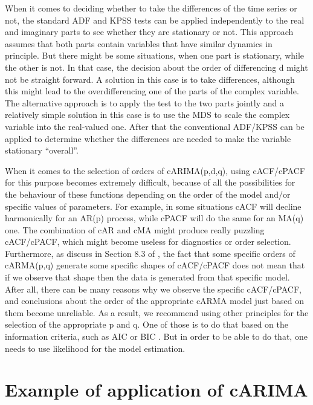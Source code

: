 \documentclass[
]{book}
\begin{document}
When it comes to deciding whether to take the differences of the time series or not, the standard ADF \citep{Dickey1979} and KPSS \citep{Kwiatkowski1992} tests can be applied independently to the real and imaginary parts to see whether they are stationary or not. This approach assumes that both parts contain variables that have similar dynamics in principle. But there might be some situations, when one part is stationary, while the other is not. In that case, the decision about the order of differencing d might not be straight forward. A solution in this case is to take differences, although this might lead to the overdifferencing one of the parts of the complex variable. The alternative approach is to apply the test to the two parts jointly and a relatively simple solution in this case is to use the MDS to scale the complex variable into the real-valued one. After that the conventional ADF/KPSS can be applied to determine whether the differences are needed to make the variable stationary ``overall''.

When it comes to the selection of orders of cARIMA(p,d,q), using cACF/cPACF for this purpose becomes extremely difficult, because of all the possibilities for the behaviour of these functions depending on the order of the model and/or specific values of parameters. For example, in some situations cACF will decline harmonically for an AR(p) process, while cPACF will do the same for an MA(q) one. The combination of cAR and cMA might produce really puzzling cACF/cPACF, which might become useless for diagnostics or order selection. Furthermore, as discuss in Section 8.3 of \citet{SvetunkovAdam}, the fact that some specific orders of cARMA(p,q) generate some specific shapes of cACF/cPACF does not mean that if we observe that shape then the data is generated from that specific model. After all, there can be many reasons why we observe the specific cACF/cPACF, and conclusions about the order of the appropriate cARMA model just based on them become unreliable. As a result, we recommend using other principles for the selection of the appropriate p and q. One of those is to do that based on the information criteria, such as AIC \citep{Akaike1974} or BIC \citep{Schwarz1978}. But in order to be able to do that, one needs to use likelihood for the model estimation.

\hypertarget{example-of-application-of-carima}{%
\section{Example of application of cARIMA}\label{example-of-application-of-carima}}
\end{document}
